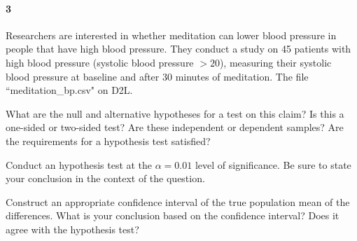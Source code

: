 \documentclass{article}
\begin{document}
\begin{flushleft}
\newpage
\paragraph{3} Researchers are interested in whether meditation can lower blood pressure in people that have high blood pressure. They conduct a study on 45 patients with high blood pressure (systolic blood pressure $> 20$), measuring their systolic blood pressure at baseline and after 30 minutes of meditation. The file ``meditation\_bp.csv" on D2L.
\begin{enumalpha}
\item What are the null and alternative hypotheses for a test on this claim? Is this a one-sided or two-sided test? Are these independent or dependent samples? Are the requirements for a hypothesis test satisfied?
\vspace{2.25in}
\item Conduct an hypothesis test at the $\alpha = 0.01$ level of significance. Be sure to state your conclusion in the context of the question.
\vspace{2.25in}
\item Construct an appropriate confidence interval of the true population mean of the differences. What is your conclusion based on the confidence interval? Does it agree with the hypothesis test?
\end{enumalpha}



\end{flushleft}
\end{document}
